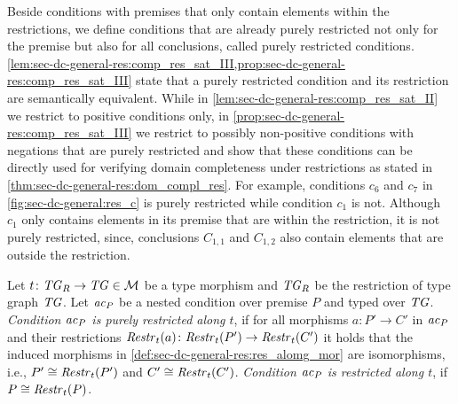 Beside conditions with premises that only contain elements within the restrictions, we define conditions that are already purely restricted not only for the premise but also for all conclusions, called purely restricted conditions.
\cref{lem:sec-dc-general-res:comp_res_sat_III,prop:sec-dc-general-res:comp_res_sat_III} state that a purely restricted condition and its restriction are semantically equivalent.
While in \cref{lem:sec-dc-general-res:comp_res_sat_II} we restrict to positive conditions only, in \cref{prop:sec-dc-general-res:comp_res_sat_III} we restrict to possibly non-positive conditions with negations that are purely restricted and show that these conditions can be directly used for verifying domain completeness under restrictions as stated in \cref{thm:sec-dc-general-res:dom_compl_res}.
For example, conditions $c_6$ and $c_7$ in \cref{fig:sec-dc-general:res_c} is purely restricted while condition $c_1$ is not.
Although $c_1$ only contains elements in its premise that are within the restriction, it is not purely restricted, since, conclusions $C_{1,1}$ and $C_{1,2}$ also contain elements that are outside the restriction.

\begin{definition}
Let $t\colon \mathit{TG}_R \to \mathit{TG} \in {\cal M}$ be a type morphism and $\mathit{TG}_R$ be the restriction of type graph $\mathit{TG}$.
Let $\mathit{ac}_P$ be a nested condition over premise $P$ and typed over $\mathit{TG}$.
\emph{Condition $\mathit{ac}_P$ is purely restricted along $t$}, if for all morphisms $a\colon P' \to C'$ in $\mathit{ac}_P$ and their restrictions $\mathit{Restr}_t(a)\colon \mathit{Restr}_t(P') \to \mathit{Restr}_t(C')$ it holds that the induced morphisms in \cref{def:sec-dc-general-res:res_alomg_mor} are isomorphisms, i.e., $P' \cong \mathit{Restr}_t(P')$ and $C' \cong \mathit{Restr}_t(C')$.
\emph{Condition $\mathit{ac}_P$ is restricted along $t$}, if $P \cong \mathit{Restr}_t(P)$.
\envEndMarker
\end{definition}

